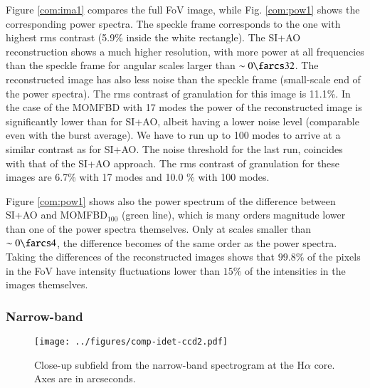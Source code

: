 Figure \ref{com:ima1} compares the full FoV image, while Fig.  \ref{com:pow1} shows the corresponding power spectra. The speckle frame corresponds to the one with highest rms contrast (5.9\% inside the white rectangle). The SI+AO reconstruction shows a much higher resolution, with more power at all frequencies than the speckle frame for angular scales larger than  $\sim 0\farcs32$. The reconstructed image has also less noise than the speckle frame (small-scale end of the power spectra). The rms contrast of granulation for this image is 11.1\%. In the case of the MOMFBD with 17 modes the power of the reconstructed image is significantly lower than for SI+AO, albeit having a lower noise level (comparable even with the burst average). We have to run up to 100 modes to arrive at a similar contrast as for SI+AO. The noise threshold for the last run, coincides with that of the SI+AO approach. The rms contrast of granulation for these images are 6.7\% with 17 modes and 10.0 \% with 100 modes.



Figure \ref{com:pow1} shows also the power spectrum of the difference between SI+AO and MOMFBD$_{100}$ (green line), which is many orders magnitude lower than one of the power spectra themselves. Only at scales smaller than $\sim0\farcs4$, the difference becomes of the same order as the power spectra. Taking the differences of the reconstructed images shows that $99.8\%$ of the pixels in the FoV have intensity fluctuations lower than $15\%$ of the intensities in the images themselves. 
%


\subsubsection*{Narrow-band}
\begin{figure}[b]
\begin{center}
\texttt{[image: ../figures/comp-idet-ccd2.pdf]}
\caption{Close-up subfield from the narrow-band spectrogram at the H$\alpha$ core. Axes are in arcseconds.}
\label{com:ima2b}
\end{center}
\end{figure}

